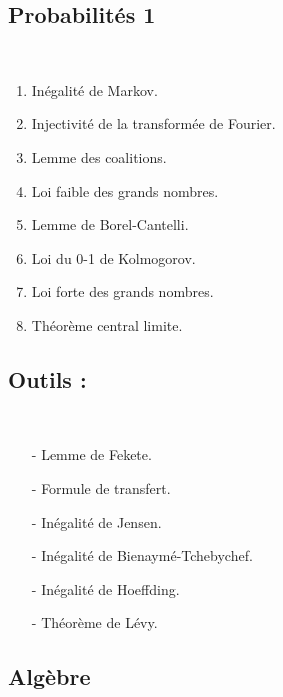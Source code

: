 \documentclass[12pt,a4paper]{article}
\begin{document}
\newpage\begin{center}
\section*{Probabilités 1} 
\end{center}
~\\
\begin{enumerate}
\item Inégalité de Markov. \\
\item Injectivité de la transformée de Fourier.\\
\item Lemme des coalitions.\\
\item Loi faible des grands nombres.\\
\item Lemme de Borel-Cantelli. \\
\item Loi du 0-1 de Kolmogorov. \\
\item Loi forte des grands nombres. \\
\item Théorème central limite. \\
\end{enumerate}


\subsection*{Outils :} ~
\begin{itemize}
\item[-] Lemme de Fekete. \\
\item[-] Formule de transfert. \\
\item[-] Inégalité de Jensen. \\
\item[-] Inégalité de Bienaymé-Tchebychef. \\
\item[-] Inégalité de Hoeffding. \\
\item[-] Théorème de Lévy.
\end{itemize}



\newpage
\begin{center}
\section*{Algèbre} 
\end{center}
\end{document}
